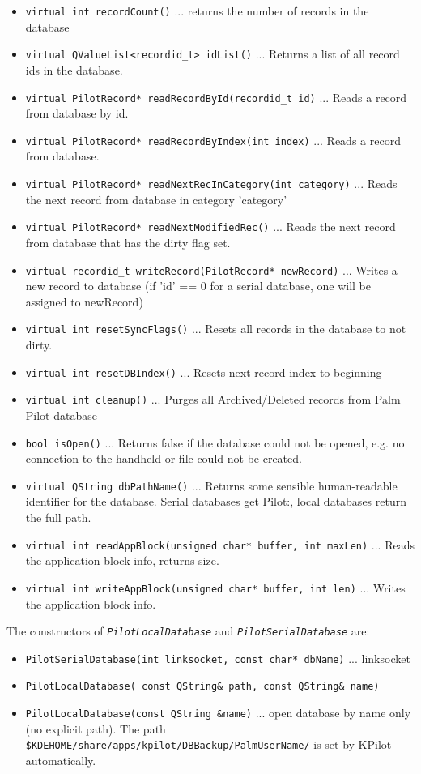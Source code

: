 \documentclass[10pt,a4paper]{article}
\newcommand{\code}[1]{{\small\texttt{#1}}}
\newcommand{\file}[1]{{\small\texttt{#1}}}
\newcommand{\class}[1]{{\small\em\texttt{#1}}}
\begin{document}
\begin{itemize}
\item\code{virtual int recordCount()} ... returns the number of records 
in the database
\item\code{virtual QValueList<recordid\_t> idList()} ... Returns a list 
of all record ids in the database.
\item\code{virtual PilotRecord* readRecordById(recordid\_t id)} ... Reads 
a record from database by id.
\item\code{virtual PilotRecord* readRecordByIndex(int index)} ... Reads a 
record from database.
\item\code{virtual PilotRecord* readNextRecInCategory(int category)} ... 
Reads the next record from database in category 'category'
\item\code{virtual PilotRecord* readNextModifiedRec()} ... Reads the next 
record from database that has the dirty flag set.
\item\code{virtual recordid\_t writeRecord(PilotRecord* newRecord)} ... Writes 
a new record to database (if 'id' == 0 for a serial database, one will be 
assigned to newRecord)
\item\code{virtual int resetSyncFlags()} ... Resets all records in the 
database to not dirty.
\item\code{virtual int resetDBIndex()} ... Resets next record index to beginning
\item\code{virtual int cleanup()} ... Purges all Archived/Deleted records 
from Palm Pilot database
\item\code{bool isOpen()} ... Returns false if the database could not be 
opened, e.g. no connection to the handheld or file could not be created.
\item\code{virtual QString dbPathName()} ... Returns some sensible human-readable 
identifier for the database. Serial databases get Pilot:, local databases 
return the full path.
\item\code{virtual int readAppBlock(unsigned char* buffer, int maxLen)} ... 
Reads the application block info, returns size.
\item\code{virtual int writeAppBlock(unsigned char* buffer, int len)} ... 
Writes the application block info.
\end{itemize}


The constructors of \class{PilotLocalDatabase} and \class{PilotSerialDatabase} are:
\begin{itemize}
\item\code{PilotSerialDatabase(int linksocket, const char* dbName)} ... linksocket
\item\code{PilotLocalDatabase( const QString\& path, const QString\& name)}
\item\code{PilotLocalDatabase(const QString \&name)} ... open database by name only
(no explicit path). The path \file{\$KDEHOME/share/apps/kpilot/DBBackup/PalmUserName/} 
is set by KPilot automatically.
\end{itemize}
\end{document}
